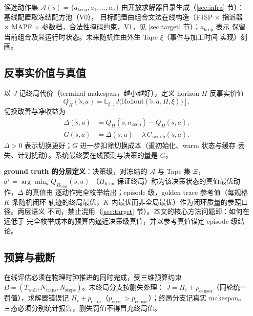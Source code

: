 \documentclass[11pt,a4paper]{article}
\newcommand{\E}{\mathbb{E}}
\begin{document}
候选动作集
$\mathcal{A}(\tilde{s}) = \{a_\text{keep}, a_1, \dots, a_n\}$
由开放求解器目录生成（\ref{sec:infra} 节）：基线配置取冻结配方池（V0），
目标配置由组合文法在线构造（FJSP $\times$ 指派器 $\times$ MAPF $\times$
参数档，合法性掩码约束，V1，见 \ref{sec:target} 节）；$a_\text{keep}$ 表示
保留当前组合及其运行时状态。未来随机性由外生 Tape $\xi$（事件与加工时间
实现）刻画。

\subsection{反事实价值与真值}

以 $J$ 记终局代价（terminal makespan，越小越好），定义 horizon-$H$ 反事实价值
\begin{equation}
Q_H(\tilde{s}, a) = \E_\xi\!\left[ J\big(\mathrm{Rollout}(\tilde{s}, a, H, \xi)\big) \right],
\label{eq:qh}
\end{equation}
切换改善与净收益为
\begin{align}
\Delta(\tilde{s}, a) &= Q_H(\tilde{s}, a_\text{keep}) - Q_H(\tilde{s}, a),\\
G(\tilde{s}, a) &= \Delta(\tilde{s}, a) - \lambda\, C_\text{switch}(\tilde{s}, a).
\label{eq:g}
\end{align}
$\Delta > 0$ 表示切换更好；$G$ 进一步扣除切换成本（重初始化、warm 状态与缓存
丢失、计划扰动）。系统最终要在线预测与决策的量是 $G$。

\textbf{ground truth 的分层定义}：决策级，对冻结的 $\mathcal{A}$ 与 Tape 集
$\Xi$，$a^\star = \arg\min_a Q_{H_\text{term}}(\tilde{s}, a)$
（$H_\text{term}$ 保证终局）称为该决策状态的真值最优动作，$\Delta$ 的真值由
逐动作完全枚举给出；episode 级，golden trace 参考值（每规格 $K$ 条随机闭环
轨迹的终局最优，$K$ 内最优而非全局最优）作为闭环质量的参照口径。两层语义
不同，禁止混用（\ref{sec:target} 节）。本文的核心方法问题即：如何在远低于
完全枚举成本的预算内逼近决策级真值，并以参考真值锚定 episode 级结论。

\subsection{预算与截断}

在线评估必须在物理时钟推进的同时完成，受三维预算约束
$B = (T_\text{wall}, N_\text{trans}, N_\text{steps})$。未终局分支按删失处理：
$\hat{J} = H_r + p_\text{censor}$（同轮统一罚值），求解器错误记
$H_r + p_\text{error}$（$p_\text{error} > p_\text{censor}$）；终局分支记真实
makespan。三态必须分别统计报告，删失罚值不得冒充终局值。
\end{document}
